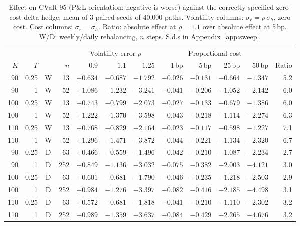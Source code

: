 \documentclass{article}
\newcommand{\cvar}{CVaR-95}
\newcommand{\bps}{\,bp}
\begin{document}
\begin{table}[t]
  \caption{Effect on \cvar{} (P\&L orientation; negative is worse) against the correctly
    specified zero-cost delta hedge; mean of 3 paired seeds of 40{,}000 paths. Volatility
    columns: $\sigma_r = \rho\,\sigma_h$, zero cost. Cost columns: $\sigma_r = \sigma_h$. Ratio:
    absolute effect at $\rho = 1.1$ over absolute effect at 5\bps{}. W/D: weekly/daily
    rebalancing, $n$ steps. S.d.s in Appendix~\ref{app:sweep}.}
  \label{tab:sweep}
  \centering
  \footnotesize
  \setlength{\tabcolsep}{3.6pt}
  \begin{tabular}{rrcr rrr rrrr r}
    \toprule
     & & & & \multicolumn{3}{c}{Volatility error $\rho$} & \multicolumn{4}{c}{Proportional cost} & \\
    \cmidrule(lr){5-7}\cmidrule(lr){8-11}
    $K$ & $T$ & & $n$ & $0.9$ & $1.1$ & $1.25$ & 1\bps{} & 5\bps{} & 25\bps{} & 50\bps{} & Ratio \\
    \midrule
    90 & 0.25 & W & 13 & $+0.634$ & $-0.687$ & $-1.792$ & $-0.026$ & $-0.131$ & $-0.664$ & $-1.347$ & 5.2 \\
    90 & 1 & W & 52 & $+1.086$ & $-1.232$ & $-3.241$ & $-0.041$ & $-0.206$ & $-1.052$ & $-2.142$ & 6.0 \\
    100 & 0.25 & W & 13 & $+0.743$ & $-0.799$ & $-2.073$ & $-0.027$ & $-0.133$ & $-0.679$ & $-1.386$ & 6.0 \\
    100 & 1 & W & 52 & $+1.222$ & $-1.370$ & $-3.598$ & $-0.043$ & $-0.218$ & $-1.114$ & $-2.274$ & 6.3 \\
    110 & 0.25 & W & 13 & $+0.768$ & $-0.829$ & $-2.164$ & $-0.023$ & $-0.117$ & $-0.598$ & $-1.227$ & 7.1 \\
    110 & 1 & W & 52 & $+1.296$ & $-1.471$ & $-3.872$ & $-0.044$ & $-0.221$ & $-1.134$ & $-2.320$ & 6.7 \\
    \midrule
    90 & 0.25 & D & 63 & $+0.466$ & $-0.559$ & $-1.496$ & $-0.042$ & $-0.210$ & $-1.087$ & $-2.234$ & 2.7 \\
    90 & 1 & D & 252 & $+0.849$ & $-1.136$ & $-3.032$ & $-0.075$ & $-0.382$ & $-2.003$ & $-4.121$ & 3.0 \\
    100 & 0.25 & D & 63 & $+0.601$ & $-0.681$ & $-1.790$ & $-0.046$ & $-0.235$ & $-1.218$ & $-2.503$ & 2.9 \\
    100 & 1 & D & 252 & $+0.984$ & $-1.276$ & $-3.397$ & $-0.082$ & $-0.416$ & $-2.185$ & $-4.498$ & 3.1 \\
    110 & 0.25 & D & 63 & $+0.572$ & $-0.681$ & $-1.818$ & $-0.041$ & $-0.210$ & $-1.110$ & $-2.302$ & 3.2 \\
    110 & 1 & D & 252 & $+0.989$ & $-1.359$ & $-3.637$ & $-0.084$ & $-0.429$ & $-2.265$ & $-4.676$ & 3.2 \\
    \bottomrule
  \end{tabular}
\end{table}
\end{document}
